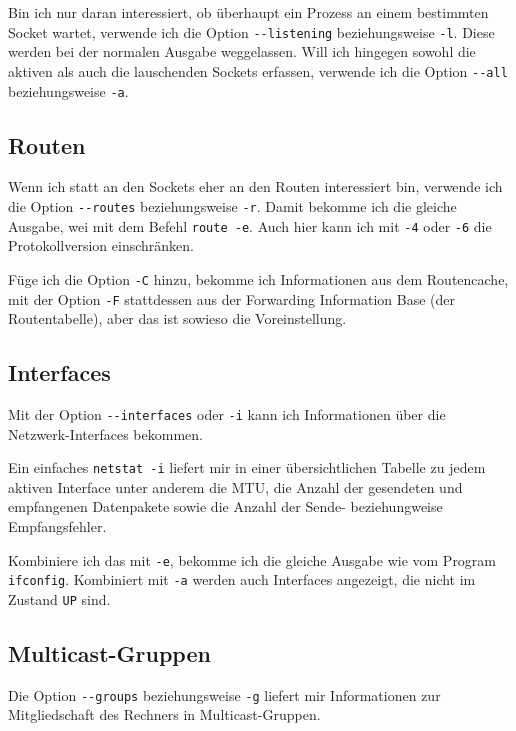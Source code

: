 \begin{normaltext}
  Bin ich nur daran interessiert, ob überhaupt ein Prozess an einem bestimmten
  Socket wartet, verwende ich die Option \verb?--listening? beziehungsweise
  \verb?-l?. Diese werden bei der normalen Ausgabe weggelassen. Will ich
  hingegen sowohl die aktiven als auch die lauschenden Sockets erfassen,
  verwende ich die Option \verb?--all? beziehungsweise \verb?-a?.

  \subsection*{Routen}
  \label{sec:netz-werkzeuge-netstat-routen}

  Wenn ich statt an den Sockets eher an den Routen interessiert bin, verwende
  ich die Option \verb?--routes? beziehungsweise \verb?-r?. Damit bekomme ich
  die gleiche Ausgabe, wei mit dem Befehl \verb?route -e?. Auch hier kann ich
  mit \verb?-4? oder \verb?-6? die Protokollversion einschränken.

  Füge ich die Option \verb?-C? hinzu, bekomme ich Informationen aus dem
  Routencache, mit der Option \verb?-F? stattdessen aus der Forwarding
  Information Base (der Routentabelle), aber das ist sowieso die
  Voreinstellung.

  \subsection*{Interfaces}
  \label{sec:netz-werkzeuge-netstat-interfaces}

  Mit der Option \verb?--interfaces? oder \verb?-i? kann ich Informationen
  über die Netzwerk-Interfaces bekommen.

  Ein einfaches \verb?netstat -i? liefert mir in einer übersichtlichen Tabelle
  zu jedem aktiven Interface unter anderem die MTU, die Anzahl der gesendeten
  und empfangenen Datenpakete sowie die Anzahl der Sende- beziehungweise
  Empfangsfehler.

  Kombiniere ich das mit \verb?-e?, bekomme ich die gleiche Ausgabe wie vom
  Program \verb?ifconfig?. Kombiniert mit \verb?-a? werden auch Interfaces
  angezeigt, die nicht im Zustand \verb?UP? sind.

  \subsection*{Multicast-Gruppen}
  \label{sec:netz-werkzeuge-netstat-groups}
  Die Option \verb?--groups? beziehungsweise \verb?-g? liefert mir
  Informationen zur Mitgliedschaft des Rechners in Multicast-Gruppen.


\end{normaltext}
